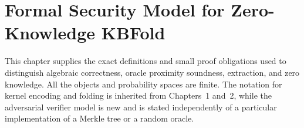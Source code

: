 \section{Formal Security Model for Zero-Knowledge KBFold}\label{sec:security}
This chapter supplies the exact definitions and small proof obligations used to distinguish algebraic correctness, oracle proximity soundness, extraction, and zero knowledge. All the objects and probability spaces are finite. The notation for kernel encoding and folding is inherited from Chapters~1 and~2, while the adversarial verifier model is new and is stated independently of a particular implementation of a Merkle tree or a random oracle.







